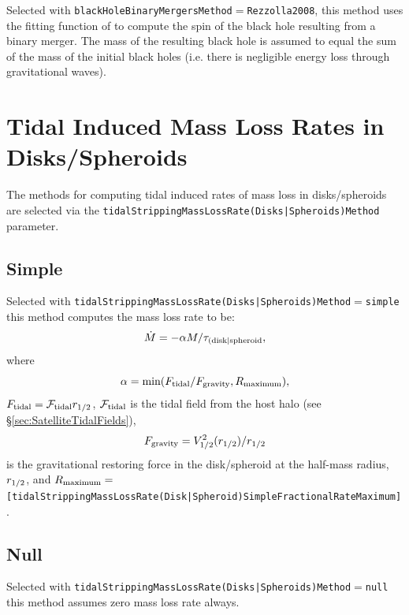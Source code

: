 Selected with {\tt blackHoleBinaryMergersMethod}$=${\tt Rezzolla2008}, this method uses the fitting function of \cite{rezzolla_final_2008} to compute the spin of the black hole resulting from a binary merger. The mass of the resulting black hole is assumed to equal the sum of the mass of the initial black holes (i.e. there is negligible energy loss through gravitational waves).

\section{Tidal Induced Mass Loss Rates in Disks/Spheroids}\label{sec:TidalMassLossRates}

The methods for computing tidal induced rates of mass loss in disks/spheroids are selected via the {\tt tidalStrippingMassLossRate(Disks|Spheroids)Method} parameter.

\subsection{Simple}

Selected with {\tt tidalStrippingMassLossRate(Disks|Spheroids)Method}$=${\tt simple} this method computes the mass loss rate to be:
\begin{equation}
\dot{M} = -\alpha M/\tau_{\rm (disk|spheroid},
\end{equation}
where
\begin{equation}
\alpha = \hbox{min}(F_{\rm tidal}/F_{\rm gravity},R_{\rm maximum}),
\end{equation}
$F_{\rm tidal}=\mathcal{F}_{\rm tidal} r_{1/2}$, $\mathcal{F}_{\rm tidal}$ is the tidal field from the host halo (see \S\ref{sec:SatelliteTidalFields}),
\begin{equation}
F_{\rm gravity} = V_{1/2}^2(r_{1/2})/r_{1/2}
\end{equation}
is the gravitational restoring force in the disk/spheroid at the half-mass radius, $r_{\rm 1/2}$, and $R_{\rm maximum}=${\tt [tidalStrippingMassLossRate(Disk|Spheroid)SimpleFractionalRateMaximum]}.

\subsection{Null}

Selected with {\tt tidalStrippingMassLossRate(Disks|Spheroids)Method}$=${\tt null} this method assumes zero mass loss rate always.


